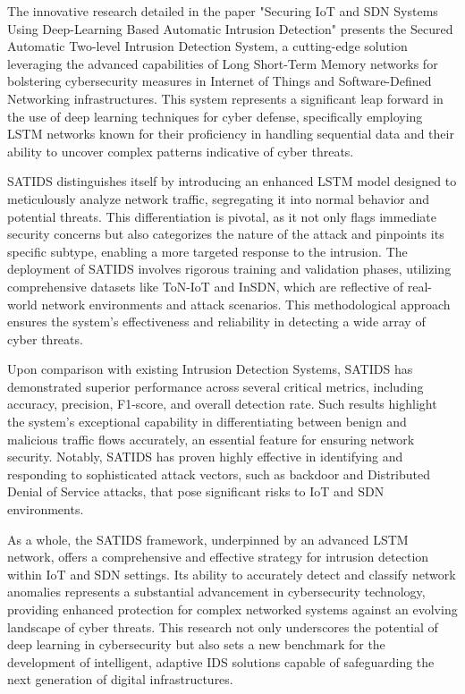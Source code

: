 \par 
The innovative research detailed in the paper "Securing IoT and SDN Systems Using Deep-Learning Based Automatic Intrusion Detection" presents the Secured Automatic Two-level Intrusion Detection System, a cutting-edge solution leveraging the advanced capabilities of Long Short-Term Memory networks for bolstering cybersecurity measures in Internet of Things and Software-Defined Networking infrastructures. This system represents a significant leap forward in the use of deep learning techniques for cyber defense, specifically employing LSTM networks known for their proficiency in handling sequential data and their ability to uncover complex patterns indicative of cyber threats.\par 
SATIDS distinguishes itself by introducing an enhanced LSTM model designed to meticulously analyze network traffic, segregating it into normal behavior and potential threats. This differentiation is pivotal, as it not only flags immediate security concerns but also categorizes the nature of the attack and pinpoints its specific subtype, enabling a more targeted response to the intrusion. The deployment of SATIDS involves rigorous training and validation phases, utilizing comprehensive datasets like ToN-IoT and InSDN, which are reflective of real-world network environments and attack scenarios. This methodological approach ensures the system's effectiveness and reliability in detecting a wide array of cyber threats.\par 
Upon comparison with existing Intrusion Detection Systems, SATIDS has demonstrated superior performance across several critical metrics, including accuracy, precision, F1-score, and overall detection rate. Such results highlight the system's exceptional capability in differentiating between benign and malicious traffic flows accurately, an essential feature for ensuring network security. Notably, SATIDS has proven highly effective in identifying and responding to sophisticated attack vectors, such as backdoor and Distributed Denial of Service attacks, that pose significant risks to IoT and SDN environments.\par 
As a whole, the SATIDS framework, underpinned by an advanced LSTM network, offers a comprehensive and effective strategy for intrusion detection within IoT and SDN settings. Its ability to accurately detect and classify network anomalies represents a substantial advancement in cybersecurity technology, providing enhanced protection for complex networked systems against an evolving landscape of cyber threats. This research not only underscores the potential of deep learning in cybersecurity but also sets a new benchmark for the development of intelligent, adaptive IDS solutions capable of safeguarding the next generation of digital infrastructures\cite{ELSAYED2023102211}.
